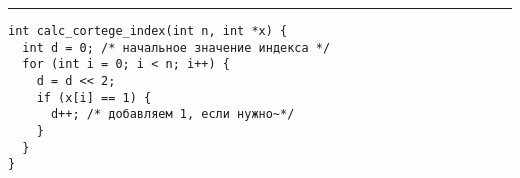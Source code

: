 \documentclass{article}
\begin{document}
\lstset{language = C,
    extendedchars = \true,
    keepspaces = true,
    breaklines=true,
    frame=lines}
\hrule
\begin{lstlisting}[title=\textbf {Алгоритм 2.1} Построение базиса матроида]
int calc_cortege_index(int n, int *x) {
  int d = 0; /* начальное значение индекса */
  for (int i = 0; i < n; i++) {
    d = d << 2;
    if (x[i] == 1) {
      d++; /* добавляем 1, если нужнo~*/
    }
  }
}
\end{lstlisting}
\end{document}
